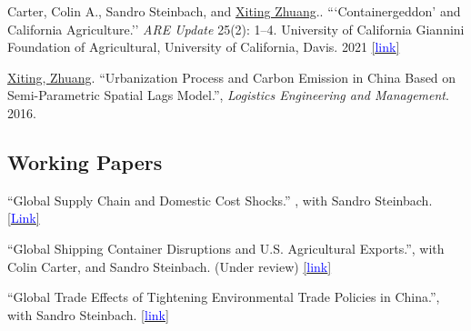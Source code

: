 \documentclass[10.5 pt,letterpaper]{article}
\renewenvironment{itemize}{
	\begin{list}{}{
			\setlength{\leftmargin}{1.5em}
		}
	}{
	\end{list}
}
\begin{document}
\begin{itemize}
 
      \item[-] Carter, Colin A., Sandro Steinbach, and \underline{Xiting Zhuang}.. ```Containergeddon’ and California Agriculture.'' \textit{ARE Update} 25(2): 1–4. University of California Giannini Foundation of Agricultural, University of California, Davis. 2021 \href{https://s.giannini.ucop.edu/uploads/pub/2021/12/20/v25n2_1.pdf}{[{\underline{\textcolor{blue}{link}}}]}
		 	
		 \item[-]	\underline{Xiting, Zhuang}. ``Urbanization Process and Carbon Emission in China Based on Semi-Parametric Spatial Lags Model.'',   \textit{Logistics Engineering and Management}. 2016. 
 

 	
 
		\end{itemize}
	
 
		
		
		
		
	\subsection*{\textbf{Working Papers}}
	
	\begin{itemize}
	

\item[-]	``Global Supply Chain and Domestic Cost Shocks.''  ,  with   Sandro Steinbach.   
\href{https://xiting-zhuang.github.io/file/jmp.pdf}{[{\underline{\textcolor{blue}{Link}}}]}  




	 \item[-]	``Global Shipping Container Disruptions and U.S. Agricultural Exports.'',  with Colin Carter, and Sandro Steinbach.  (Under review)
	  	\href{http://dx.doi.org/10.22004/ag.econ.320397}{[{\underline{\textcolor{blue}{link}}}]}
	
	
 
 

 
	
 		
	 \item[-] ``Global Trade Effects of Tightening Environmental Trade Policies in China.'', with Sandro Steinbach. 
\href{https://www.dropbox.com/scl/fi/21o4ldsv04zo4w7bs6y5w/Manuscript.pdf?rlkey=phzrh7uhti8zm0wxpn786gu94&dl=0}{[{\underline{\textcolor{blue}{link}}}]}

 

	\end{itemize}
	
\end{document}

